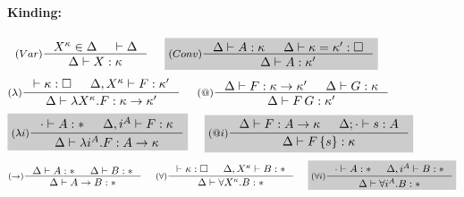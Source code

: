 \begin{figure}
\begin{framed}
\paragraph{Kinding:} 
\[ \inference[($Var$)]{X^\kappa\in\Delta & |- \Delta}
                       {\Delta |- X : \kappa}
 ~~~~ \newFi{
   \inference[($Conv$)]{ \Delta |- A : \kappa
                       & \Delta |- \kappa = \kappa' : \square }
                       {\Delta |- A : \kappa'} }
\]
\[
  \inference[($\lambda$)]{|- \kappa:\square & \Delta,X^\kappa |- F : \kappa'}
                          {\Delta |- \lambda X^\kappa.F : \kappa -> \kappa'}
 ~~~~
   \inference[($@$)]{ \Delta |- F : \kappa -> \kappa'
                    & \Delta |- G : \kappa }
                    {\Delta |- F\,G : \kappa'}
\]
\[ \newFi{
  \inference[($\lambda i$)]{\cdot |- A:* & \Delta,i^A |- F : \kappa}
                            {\Delta |- \lambda i^A.F : A->\kappa} }
 ~~~~ \newFi{
   \inference[($@i$)]{ \Delta |- F : A -> \kappa
                     & \Delta;\cdot |- s : A }
                     {\Delta |- F\,\{s\} : \kappa} }
\]
\[ \inference[($->$)]{\Delta |- A : * & \Delta |- B : *}
                     {\Delta |- A -> B : * }
 ~~~~
   \inference[($\forall$)]{|- \kappa:\square & \Delta, X^\kappa |- B : *}
                          {\Delta |- \forall X^\kappa . B : *}
 ~~~~ \newFi{
   \inference[($\forall i$)]{\cdot |- A:* & \Delta, i^A |- B : *}
                            {\Delta |- \forall i^A . B : *} }
\]


\end{framed}
\end{figure}
